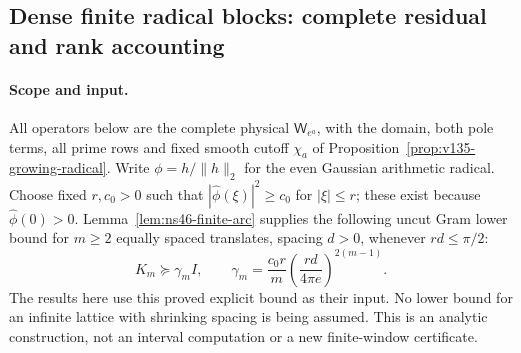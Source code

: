 \subsection*{Dense finite radical blocks: complete residual and rank accounting}
\label{ns46-a2-sec-block}

\paragraph{Scope and input.}
All operators below are the complete physical $\mathsf W_{e^a}$,
with the domain, both pole terms, all prime rows and fixed smooth
cutoff $\chi_a$ of Proposition~\ref{prop:v135-growing-radical}.
Write $\phi=h/\|h\|_2$ for the even Gaussian arithmetic radical.
Choose fixed $r,c_0>0$ such that $|\widehat\phi(\xi)|^2\ge c_0$
for $|\xi|\le r$; these exist because $\widehat\phi(0)>0$.
Lemma~\ref{lem:ns46-finite-arc} supplies the following
uncut Gram lower bound for $m\ge2$ equally spaced translates,
spacing $d>0$, whenever $rd\le\pi/2$:
\begin{equation}\label{ns46-a2-eq-arc-input}
 K_m\succeq\gamma_m I,\qquad
 \gamma_m=\frac{c_0r}{m}
       \left(\frac{rd}{4\pi e}\right)^{2(m-1)}.
\end{equation}
The results here use this proved explicit bound as their input.
No lower bound for an infinite lattice with shrinking spacing is
being assumed. This is an analytic construction, not an interval
computation or a new finite-window certificate.

